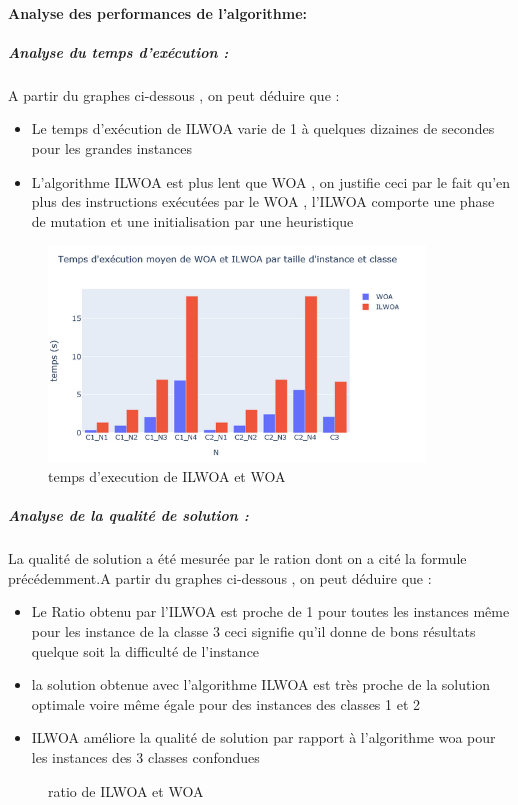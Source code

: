 \documentclass[12pt]{article}
\begin{document}
\paragraph{Analyse des performances de l'algorithme: }
\subparagraph{Analyse du temps d'exécution :}
A partir du graphes ci-dessous , on peut déduire que :
\begin{itemize}
    \item Le temps d'exécution de ILWOA varie de 1  à quelques dizaines de secondes pour les grandes instances 
    \item L’algorithme ILWOA est plus lent que WOA , on justifie ceci par le fait qu’en plus des instructions exécutées par le WOA , l’ILWOA comporte une phase de mutation et une initialisation par une heuristique  
\end{itemize}
\begin{figure}[h!]
    \centering
     \includegraphics[width=10cm]{../figures/woavsilwoatemps.PNG}
     \caption[\small]{temps d'execution de ILWOA et WOA}
 \end{figure}
 \subparagraph{Analyse de la qualité de solution :}
La qualité de solution a été mesurée par le ration dont on a cité la formule précédemment.A partir du graphes ci-dessous , on peut déduire que :
 \begin{itemize}
     \item Le Ratio obtenu par l’ILWOA est proche de 1 pour toutes les instances même pour les instance de la classe 3 ceci signifie qu’il donne de bons résultats quelque soit la difficulté de l’instance 
     \item la solution obtenue avec l’algorithme ILWOA est très proche de la solution optimale voire même égale pour des instances des classes 1 et 2 
     \item ILWOA améliore la qualité de solution par rapport à l’algorithme woa pour les instances des 3 classes confondues
 \end{itemize}
 \begin{figure}[h!]
     \centering
      \caption[\small]{ratio de ILWOA et WOA}
  \end{figure}
\end{document}
